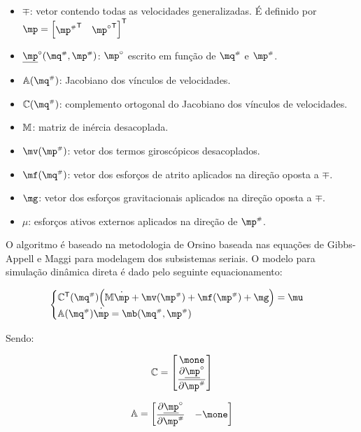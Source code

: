 \documentclass[a4paper,11pt,brazil,fleqn]{article}
\begin{document}
\begin{itemize}
\item $\mp$: vetor contendo todas as velocidades generalizadas. É definido por $\mp = \begin{bmatrix} {\mp\ssh}^\msT & {\mp\cir}^\msT \end{bmatrix}^\msT $
\item $\underline{\mp}\cir(\mq\ssh,\mp\ssh)$: $\mp\cir$ escrito em fun\c{c}\~ao de $\mq\ssh$ e $\mp\ssh$.
\item $\mA(\mq\ssh)$: Jacobiano dos v\'inculos de velocidades.
\item $\mC(\mq\ssh)$: complemento ortogonal do Jacobiano dos v\'inculos de velocidades.
\item $\mathbb{M}$: matriz de in\'ercia desacoplada.
\item $\mv(\mp\ssh)$: vetor dos termos girosc\'opicos desacoplados.
\item $\mf(\mq\ssh)$: vetor dos esfor\c{c}os de atrito aplicados na dire\c{c}\~ao oposta a $\mp$.
\item $\mg$: vetor dos esfor\c{c}os gravitacionais aplicados na dire\c{c}\~ao oposta a $\mp$.
\item $\mu $: esfor\c{c}os ativos externos aplicados na dire\c{c}\~ao de $\mp\ssh$.

\end{itemize}

O algoritmo \'e baseado na metodologia de Orsino baseada nas equa\c{c}\~oes de Gibbs-Appell e Maggi para modelagem dos subsistemas seriais. O modelo para simula\c{c}\~ao din\^amica direta \'e dado pelo seguinte equacionamento:

\begin{equation} \label{eq:DinamicaDireta}
\begin{cases}
\mC^\mathsf{T}(\mq\ssh) \Big( \mM \dot{\mp} + \mv(\mp\ssh) + \mf(\mp\ssh) + \mg \Big) = \mu \\
\mA(\mq\ssh) \dot{\mp} = \mb(\mq\ssh,\mp\ssh)
\end{cases}
\end{equation}

Sendo:

\begin{equation} \label{eq:MatrizC}
\mC = \begin{bmatrix}
\mone \\
\displaystyle\frac{\partial \underline{\mp}^\circ}{\partial \mp\ssh}
\end{bmatrix}
\end{equation}

\begin{equation} \label{eq:MatrizA}
\mA = \begin{bmatrix}
\displaystyle\frac{\partial \underline{\mp}^\circ}{\partial \mp\ssh} & -\mone 
\end{bmatrix}
\end{equation}
\end{document}
